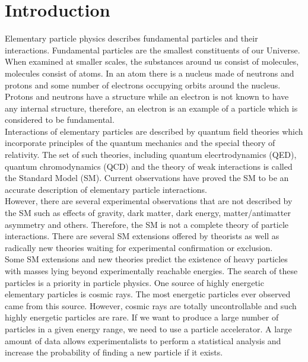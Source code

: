 \chapter{Introduction}
\label{sec:intro}

Elementary particle physics describes fundamental particles and their interactions. Fundamental particles are the smallest constituents of our Universe. When examined at smaller scales, the substances around us consist of molecules, molecules consist of atoms. In an atom there is a nucleus made of neutrons and protons and some number of electrons occupying orbits around the nucleus. Protons and neutrons have a structure while an electron is not known to have any internal structure, therefore, an electron is an example of a particle which is considered to be fundamental.\\

Interactions of elementary particles are described by quantum field theories which incorporate principles of the quantum mechanics and the special theory of relativity. The set of such theories, including quantum elecrtrodynamics (QED), quantum chromodynamics (QCD) and the theory of weak interactions is called the Standard Model (SM). Current observations have proved the SM to be an accurate description of elementary particle interactions. \\ 

However, there are several experimental observations that are not described by the SM such as effects of gravity, dark matter, dark energy, matter/antimatter asymmetry and others. Therefore, the SM is not a complete theory of particle interactions. There are several SM extensions offered by theorists as well as radically new theories waiting for experimental confirmation or exclusion. \\

Some SM extensions and new theories predict the existence of heavy particles with masses lying beyond experimentally reachable energies. The search of these particles is a priority in particle physics. One source of highly energetic elementary particles is cosmic rays. The most energetic particles ever observed came from this source. However, cosmic rays are totally uncontrollable and such highly energetic particles are rare. If we want to produce a large number of particles in a given energy range, we need to use a particle accelerator. A large amount of data allows experimentalists to perform a statistical analysis and increase the probability of finding a new particle if it exists.\\

